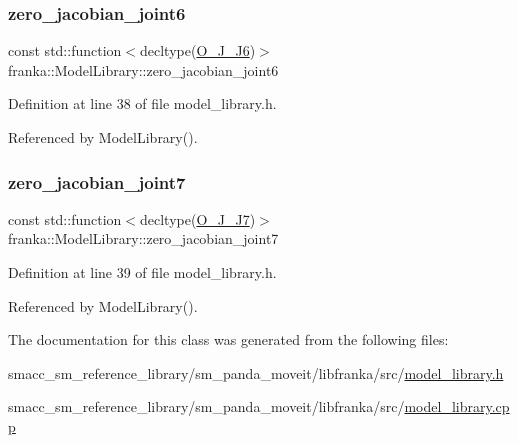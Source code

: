 \subsubsection{\texorpdfstring{zero\+\_\+jacobian\+\_\+joint6}{zero\_jacobian\_joint6}}
{\footnotesize\ttfamily const std\+::function$<$decltype(\hyperlink{libfcimodels_8h_ab451dc5c3eb43256070d6fcdbec856db}{O\+\_\+\+J\+\_\+\+J6})$>$ franka\+::\+Model\+Library\+::zero\+\_\+jacobian\+\_\+joint6}



Definition at line 38 of file model\+\_\+library.\+h.



Referenced by Model\+Library().

\mbox{\label{classfranka_1_1ModelLibrary_a51bb8156b169d11c1c51aa4752f40730}} 
\subsubsection{\texorpdfstring{zero\+\_\+jacobian\+\_\+joint7}{zero\_jacobian\_joint7}}
{\footnotesize\ttfamily const std\+::function$<$decltype(\hyperlink{libfcimodels_8h_a20be08ea71c920b7f95696b9e56f30ef}{O\+\_\+\+J\+\_\+\+J7})$>$ franka\+::\+Model\+Library\+::zero\+\_\+jacobian\+\_\+joint7}



Definition at line 39 of file model\+\_\+library.\+h.



Referenced by Model\+Library().



The documentation for this class was generated from the following files\+:\begin{DoxyCompactItemize}
\item 
smacc\+\_\+sm\+\_\+reference\+\_\+library/sm\+\_\+panda\+\_\+moveit/libfranka/src/\hyperlink{model__library_8h}{model\+\_\+library.\+h}\item 
smacc\+\_\+sm\+\_\+reference\+\_\+library/sm\+\_\+panda\+\_\+moveit/libfranka/src/\hyperlink{model__library_8cpp}{model\+\_\+library.\+cpp}\end{DoxyCompactItemize}
